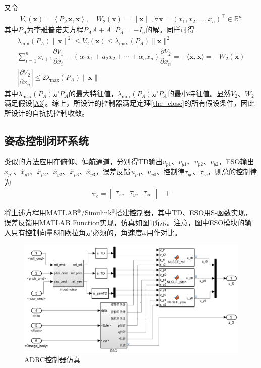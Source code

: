 又令
\begin{align}V_{2}(\bm{x})=\left\langle P_{A} \bm{x}, \bm{x}\right\rangle, \quad W_{2}(\bm{x})=\|\bm{x}\|, \forall \bm{x}=\left(x_{1}, x_{2}, \ldots, x_{n}\right)^{\top} \in \mathbb{R}^{n}\end{align}
其中$ P_{A} $为李雅普诺夫方程$P_{A} A+A^{\top} P_{A}=-I_{n}$的解。同样可得
\begin{gather}
\lambda_{\min }\left(P_{A}\right)\|\bm{x}\|^{2} \leq V_{2}(\bm{x}) \leq \lambda_{\max }\left(P_{A}\right)\|\bm{x}\|^{2} \\
\sum_{i=1}^{n} x_{i+1} \dfrac{\partial V_{1}}{\partial x_{i}}-\left(\alpha_{1} x_{1}+a_{2} x_{2}+\cdots+\alpha_{n} x_{n}\right) \dfrac{\partial V_{2}}{\partial x_{n}}=-\langle \bm{x}, \bm{x}\rangle=-W_{2}(\bm{x}) \\
\left|\dfrac{\partial V_{2}}{\partial x_{n}}\right| \leq 2 \lambda_{\max }\left(P_{A}\right)\|\bm{x}\|
\end{gather}
其中$\lambda_{\max }\left(P_{A}\right)$是$ P_A $的最大特征值，$ \lambda_{\min }\left(P_{A}\right) $是$ P_A $的最小特征值。显然$ V_2 $、$ W_2 $满足假设\ref{A3}。综上，所设计的控制器满足定理\ref{the_close}的所有假设条件，因此所设计的自抗扰控制收敛。
\subsection{姿态控制闭环系统}	
类似的方法应用在俯仰、偏航通道，分别得TD输出$ v_{p1} $、$ v_{y1} $、$ v_{p2} $、$ v_{y2} $，ESO输出$ \hat{x}_{p1} $、$ \hat{x}_{y1} $、$ \hat{x}_{p2} $、$ \hat{x}_{y2} $、$ \hat{x}_{p3} $、$  \hat{x}_{y3}  $，误差反馈$ u_{p0} $、$ u_{y0} $、控制律$\tau_{yc}$、$\tau_{zc}$，则总的控制律为
\begin{align}
\bm{\tau}_c =  \begin{bmatrix}
\tau_{x c} &
\tau_{y c} &
\tau_{z c}
\end{bmatrix}&\top	\label{eq_attitude_cpntrol_law}
\end{align}

将上述方程用MATLAB$^\circledR$/Simulink$^\circledR$搭建控制器，其中TD、ESO用S-函数实现，误差反馈用MATLAB Function实现，仿真如图\ref{fig_controller_simulink}所示。注意，图中ESO模块的输入只有控制向量$ \bm{\delta} $和欧拉角是必须的，角速度$ \omega $用作对比。
\begin{figure}[htbp]
	\centering
	\includegraphics[scale=0.36]{Fig/Fig_Controller.png}
	\caption{\label{fig_controller_simulink}ADRC控制器仿真}
\end{figure}
